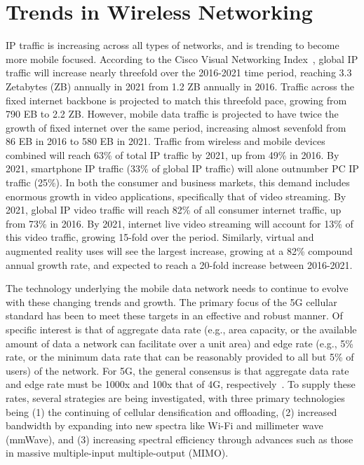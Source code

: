 \documentclass[12pt,dvipsnames]{report}
\begin{document}
\section{Trends in Wireless Networking} \label{sec:netreview}

IP traffic is increasing across all types of networks, and is trending to become more mobile focused.  According to the Cisco Visual Networking Index~\cite{ciscoVNI2017}, global IP traffic will increase nearly threefold over the 2016-2021 time period, reaching 3.3 Zetabytes (ZB) annually in 2021 from 1.2 ZB annually in 2016.  Traffic across the fixed internet backbone is projected to match this threefold pace, growing from 790 EB to 2.2 ZB.  However, mobile data traffic is projected to have twice the growth of fixed internet over the same period, increasing almost sevenfold from 86 EB in 2016 to 580 EB in 2021.  Traffic from wireless and mobile devices combined will reach 63\% of total IP traffic by 2021, up from 49\% in 2016.  By 2021, smartphone IP traffic (33\% of global IP traffic) will alone outnumber PC IP traffic (25\%).  In both the consumer and business markets, this demand includes enormous growth in video applications, specifically that of video streaming.  By 2021, global IP video traffic will reach 82\% of all consumer internet traffic, up from 73\% in 2016.  By 2021, internet live video streaming will account for 13\% of this video traffic, growing 15-fold over the period.  Similarly, virtual and augmented reality uses will see the largest increase, growing at a 82\% compound annual growth rate, and expected to reach a 20-fold increase between 2016-2021.

The technology underlying the mobile data network needs to continue to evolve with these changing trends and growth.  The primary focus of the 5G cellular standard has been to meet these targets in an effective and robust manner.  Of specific interest is that of aggregate data rate (e.g., area capacity, or the available amount of data a network can facilitate over a unit area) and edge rate (e.g., 5\% rate, or the minimum data rate that can be reasonably provided to all but 5\% of users) of the network.  For 5G, the general consensus is that aggregate data rate and edge rate must be 1000x and 100x that of 4G, respectively~\cite{6824752}.  To supply these rates, several strategies are being investigated, with three primary technologies being (1) the continuing of cellular densification and offloading, (2) increased bandwidth by expanding into new spectra like Wi-Fi and millimeter wave (mmWave), and (3) increasing spectral efficiency through advances such as those in massive multiple-input multiple-output (MIMO).
\end{document}
